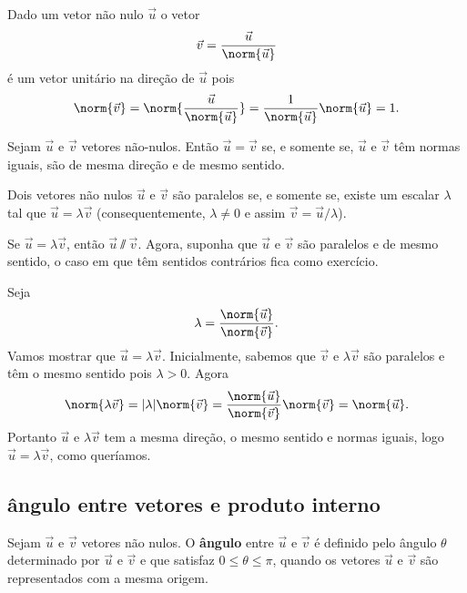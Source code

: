 \begin{observacao}
    Dado um vetor não nulo $\vec{u}$ o vetor
    \[
          \vec{v} = \dfrac{\vec{u}}{\norm{\vec{u}}}
    \]
    é um vetor unitário na direção de $\vec{u}$ pois
    \[
          \norm{\vec{v}} = \norm{\dfrac{\vec{u}}{\norm{\vec{u}}}} = \dfrac{1}{\norm{\vec{u}}}\norm{\vec{u}} = 1.
    \]

\end{observacao}
\begin{definicao}
    Sejam $\vec{u}$ e $\vec{v}$ vetores não-nulos. Então $\vec{u} = \vec{v}$ se, e somente se, $\vec{u}$ e $\vec{v}$ têm normas iguais, são de mesma direção e de mesmo sentido.
\end{definicao}

\begin{proposicao}\label{vetores_paralelos}
  Dois vetores não nulos $\vec{u}$ e $\vec{v}$ são paralelos se, e somente se, existe um escalar $\lambda$ tal que $\vec{u} = \lambda\vec{v}$ (consequentemente, $\lambda \ne 0$ e assim $\vec{v} = \vec{u}/\lambda$).
\end{proposicao}
\begin{prova}
    Se $\vec{u} = \lambda\vec{v}$, então $\vec{u}\varparallel\vec{v}$.
    Agora, suponha que $\vec{u}$ e $\vec{v}$ são paralelos e de mesmo sentido, o caso em que têm sentidos contrários fica como exercício.

    Seja
    \[
        \lambda = \dfrac{\norm{\vec{u}}}{\norm{\vec{v}}}.
    \]
    Vamos mostrar que $\vec{u} = \lambda\vec{v}$. Inicialmente, sabemos que $\vec{v}$ e $\lambda\vec{v}$ são paralelos e têm o mesmo sentido pois $\lambda > 0$. Agora
    \[
        \norm{\lambda\vec{v}} = |\lambda|\norm{\vec{v}} = \dfrac{\norm{\vec{u}}}{\norm{\vec{v}}}\norm{\vec{v}} = \norm{\vec{u}}.
    \]
    Portanto $\vec{u}$ e $\lambda\vec{v}$ tem a mesma direção, o mesmo sentido e normas iguais, logo $\vec{u} = \lambda\vec{v}$, como queríamos.
\end{prova}

\subsection{ângulo entre vetores e produto interno} %
\label{sub:angulo_entre_vetores_e_produto_interno}
\begin{definicao}
  Sejam $\vec{u}$ e $\vec{v}$ vetores não nulos. O \textbf{ângulo} entre $\vec{u}$ e $\vec{v}$ é definido pelo ângulo $\theta$ determinado por $\vec{u}$ e $\vec{v}$ e que satisfaz $0 \le \theta \le \pi$, quando os vetores $\vec{u}$ e $\vec{v}$ são representados com a mesma origem.
\end{definicao}

